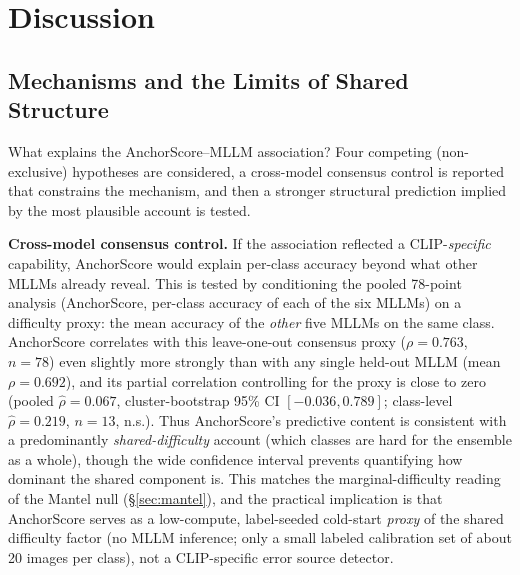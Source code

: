 \documentclass[a4paper,fleqn]{cas-sc}
\begin{document}
\section{Discussion}
\label{sec:discussion}

\subsection{Mechanisms and the Limits of Shared Structure}
\label{sec:consensus_control}
\label{sec:mechanisms}

What explains the AnchorScore--MLLM association? Four competing (non-exclusive) hypotheses are considered, a cross-model consensus control is reported that constrains the mechanism, and then a stronger structural prediction implied by the most plausible account is tested.

\textbf{Cross-model consensus control.} If the association reflected a CLIP-\emph{specific} capability, AnchorScore would explain per-class accuracy beyond what other MLLMs already reveal. This is tested by conditioning the pooled 78-point analysis (AnchorScore, per-class accuracy of each of the six MLLMs) on a difficulty proxy: the mean accuracy of the \emph{other} five MLLMs on the same class. AnchorScore correlates with this leave-one-out consensus proxy ($\rho=0.763$, $n=78$) even slightly more strongly than with any single held-out MLLM (mean $\rho=0.692$), and its partial correlation controlling for the proxy is close to zero (pooled $\hat{\rho}=0.067$, cluster-bootstrap 95\% CI $[-0.036,0.789]$; class-level $\hat{\rho}=0.219$, $n=13$, n.s.). Thus AnchorScore's predictive content is consistent with a predominantly \emph{shared-difficulty} account (which classes are hard for the ensemble as a whole), though the wide confidence interval prevents quantifying how dominant the shared component is. This matches the marginal-difficulty reading of the Mantel null (\S\ref{sec:mantel}), and the practical implication is that AnchorScore serves as a low-compute, label-seeded cold-start \emph{proxy} of the shared difficulty factor (no MLLM inference; only a small labeled calibration set of about 20 images per class), not a CLIP-specific error source detector.
\end{document}
